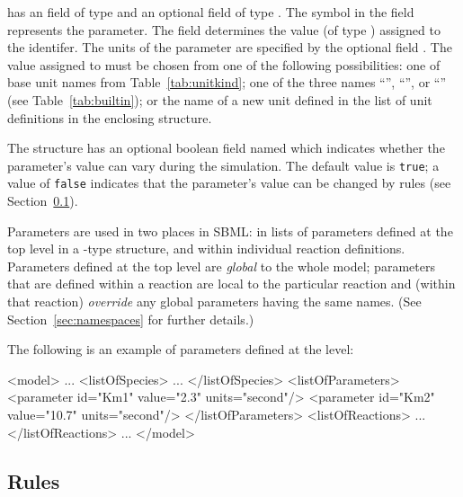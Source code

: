 \documentclass[10pt,twocolumntoc]{cekarticle}
\newcommand{\vref}[1]{\ref{#1}}
\begin{document}
 has an  field of type  and
an optional  field of type .  The
symbol in the  field represents the parameter.  The
field  determines the value (of type )
assigned to the identifer.  The units of the parameter
 are specified by the optional field .
The value assigned to  must be chosen from one of
the following possibilities: one of base unit names from
Table~\vref{tab:unitkind}; one of the three names
``'', ``'', or
``'' (see Table~\ref{tab:builtin}); or the name of
a new unit defined in the list of unit definitions in the
enclosing  structure.

The  structure has an optional boolean field named
 which indicates whether the parameter's value can vary
during the simulation.  The default value is \texttt{true}; a value of
\texttt{false} indicates that the parameter's value can be changed by
rules (see Section~\ref{sec:rules}).

Parameters are used in two places in SBML: in lists of parameters defined
at the top level in a -type structure, and within individual
reaction definitions.  Parameters defined at the top level are
\emph{global} to the whole model; parameters that are defined within
a reaction are local to the particular reaction and (within that reaction)
\emph{override} any global parameters having the same names.  (See
Section~\ref{sec:namespaces} for further details.)

The following is an example of parameters defined at the  level:

\begin{example}
<model>
    ...
    <listOfSpecies>
        ...
    </listOfSpecies>
    <listOfParameters>
        <parameter id="Km1" value="2.3" units="second"/>
        <parameter id="Km2" value="10.7" units="second"/>
    </listOfParameters>
    <listOfReactions>
        ...
    </listOfReactions>
    ...
</model>
\end{example}

\subsection{Rules}
\label{sec:rules}
\end{document}
